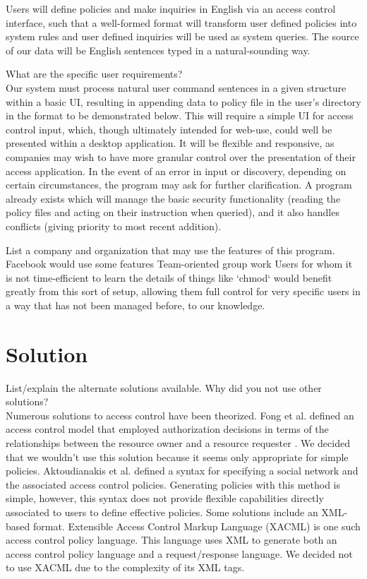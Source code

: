 \documentclass[12pt]{article}
\begin{document}
Users will define policies and make inquiries in English via an access control interface, such that a well-formed format will transform user defined policies into system rules and user defined inquiries will be used as system queries. The source of our data will be English sentences typed in a natural-sounding way.

What are the specific user requirements? \\
Our system must process natural user command sentences in a given structure within a basic UI, resulting in appending data to policy file in the user's directory in the format to be demonstrated below. This will require a simple UI for access control input, which, though ultimately intended for web-use, could well be presented within a desktop application. It will be flexible and responsive, as companies may wish to have more granular control over the presentation of their access application. In the event of an error in input or discovery, depending on certain circumstances, the program may ask for further clarification. A program already exists which will manage the basic security functionality (reading the policy files and acting on their instruction when queried), and it also handles conflicts (giving priority to most recent addition).

List a company and organization that may use the features of this program. \\
Facebook would use some features
Team-oriented group work
Users for whom it is not time-efficient to learn the details of things like `chmod` would benefit greatly from this sort of setup, allowing them full control for very specific users in a way that has not been managed before, to our knowledge.

\section{Solution}

List/explain the alternate solutions available.  Why did you not use other solutions? \\
Numerous solutions to access control have been theorized. Fong et al. defined an access control model that employed authorization decisions in terms of the relationships between the resource owner and a resource requester \cite{fong11}. We decided that we wouldn’t use this solution because it seems only appropriate for simple policies. Aktoudianakis et al. defined a syntax for specifying a social network and the associated access control policies. Generating policies with this method is simple, however, this syntax does not provide flexible capabilities directly associated to users to define effective policies. \cite{aktoudianakis13} Some solutions include an XML-based format. Extensible Access Control Markup Language (XACML) is one such access control policy language. This language uses XML to generate both an access control policy language and a request/response language. We decided not to use XACML due to the complexity of its XML tags.
\end{document}
